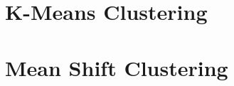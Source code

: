 \documentclass[a4paper]{article}
\begin{document}
%
%
%

\newpage
\section{K-Means Clustering}

%
%
%

\newpage
\section{Mean Shift Clustering}

%
%
%


%
%
%



\end{document}
